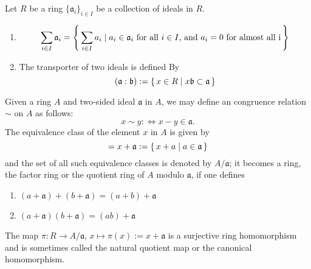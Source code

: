 \begin{defn}
    Let \(R\) be a ring \(\{\mathfrak{a}_i\}_{i \in I}\) be a collection of ideals in \(R\).
    \begin{enumerate}
        \item
        \begin{equation}
            \sum_{i \in I} \mathfrak{a}_i = \left\{\, \sum_{i \in I}a_i \mathrel{\mid} a_i \in \mathfrak{a}_i \text{ for all \(i \in I\), and \(a_i = 0\) for almost all i} \,\right\}
        \end{equation}
        \item The transporter of two ideals is defined By
        \begin{equation}
            (\mathfrak{a} : \mathfrak{b}) := \left\{\, x \in R \mathrel{\mid} x \mathfrak{b} \subset \mathfrak{a} \,\right\}
        \end{equation}
    \end{enumerate}
\end{defn}

\begin{defn}
    
\end{defn}

\begin{defn}
    
\end{defn}

\begin{defn}
    Given a ring \(A\) and two-sided ideal \(\mathfrak{a}\) in \(A\), we may define an congruence relation \(\sim\) on \(A\) as follows:
    \begin{equation}
        x \sim y :\Longleftrightarrow x - y \in \mathfrak{a} \text{.}
    \end{equation}
    The equivalence class of the element \(x\) in \(A\) is given by
    \begin{equation}
        [x] = x + \mathfrak{a} := \makeset{x + a}{a \in \mathfrak{a}}
    \end{equation}
    and the set of all such equivalence classes is denoted by \(A / \mathfrak{a}\); it becomes a ring, the factor ring or the quotient ring of \(A\) modulo \(\mathfrak{a}\), if one defines
    \begin{enumerate}
        \item \((a + \mathfrak{a}) + (b + \mathfrak{a}) = (a + b) + \mathfrak{a}\)
        \item \((a + \mathfrak{a}) (b + \mathfrak{a}) = (ab) + \mathfrak{a}\)
    \end{enumerate}
    The map \(\pi: R \longrightarrow A / \mathfrak{a}, \, x \mapsto \pi(x) := x + \mathfrak{a}\) is a surjective ring homomorphism and is sometimes called the natural quotient map or the canonical homomorphism.
\end{defn}

